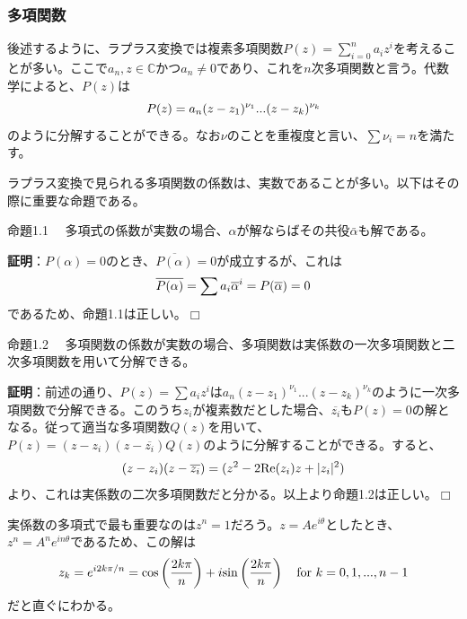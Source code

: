 \documentclass[dvipdfmx, 9pt, a4paper]{jsarticle}
\def\qed{\hfill $\Box$}
\begin{document}
\subsubsection{多項関数}
後述するように、ラプラス変換では複素多項関数$P(z)=\sum_{i=0}^n a_iz^i$を考えることが多い。ここで$a_n, z \in \mathbb{C}$かつ$a_n \neq 0$であり、これを$n$次多項関数と言う。代数学によると、$P(z)$は
\begin{equation}
P(z)=a_n(z-z_1)^{\nu_1}...(z-z_k)^{\nu_k} \notag
\end{equation}
のように分解することができる。なお$\nu$のことを重複度と言い、$\sum \nu_i=n$を満たす。\par
ラプラス変換で見られる多項関数の係数は、実数であることが多い。以下はその際に重要な命題である。
\begin{itembox}[l]{命題1.1}
　多項式の係数が実数の場合、$\alpha$が解ならばその共役$\bar{\alpha}$も解である。
\end{itembox}
{\bf 証明}：$P(\alpha)=0$のとき、$\overline{P(\alpha)}=0$が成立するが、これは
\begin{equation}
\overline{P(\alpha)}=\sum a_i \overline{\alpha}^i=P(\overline{\alpha})=0 \notag
\end{equation}
であるため、命題1.1は正しい。\qed
\begin{itembox}[l]{命題1.2}
　多項関数の係数が実数の場合、多項関数は実係数の一次多項関数と二次多項関数を用いて分解できる。
\end{itembox}
{\bf 証明}：前述の通り、$P(z)=\sum a_iz^i$は$a_n(z-z_1)^{\nu_1}...(z-z_k)^{\nu_k}$のように一次多項関数で分解できる。このうち$z_i$が複素数だとした場合、$\overline{z_i}$も$P(z)=0$の解となる。従って適当な多項関数$Q(z)$を用いて、$P(z)=(z-z_i)(z-\overline{z_i})Q(z)$のように分解することができる。すると、
\begin{equation}
(z-z_i)(z-\overline{z_i})=(z^2-2{\rm Re}(z_i)z+|z_i|^2) \notag
\end{equation}
より、これは実係数の二次多項関数だと分かる。以上より命題1.2は正しい。\qed \par
実係数の多項式で最も重要なのは$z^n=1$だろう。$z=Ae^{i\theta}$としたとき、$z^n=A^ne^{in\theta}$であるため、この解は
\begin{equation}
z_k=e^{i2k\pi/n}={\rm cos}\left(\frac{2k\pi}{n}\right)+i{\rm sin}\left(\frac{2k\pi}{n}\right)~~~{\rm for}~k=0,1,...,n-1 \notag
\end{equation}
だと直ぐにわかる。
\end{document}
